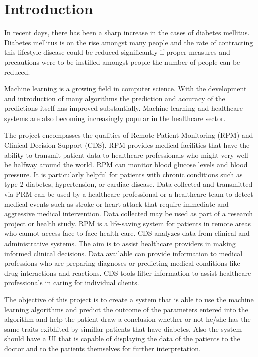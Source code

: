 \documentclass[12pt]{article}
\begin{document}
\section{Introduction}
In recent days, there has been a sharp increase in the cases of diabetes mellitus. Diabetes mellitus is on the rise amongst many people and the rate of contracting this lifestyle disease could be reduced significantly if proper measures and precautions were to be instilled amongst people the number of people can be reduced.

Machine learning is a growing field in computer science. With the development and introduction of many algorithms the prediction and accuracy of the predictions itself has improved substantially. Machine learning and healthcare systems are also becoming increasingly popular in the healthcare sector.

The project encompasses the qualities of Remote Patient Monitoring (RPM) and Clinical Decision Support (CDS). RPM provides medical facilities that have the ability to transmit patient data to healthcare professionals who might very well be halfway around the world. RPM can monitor blood glucose levels and blood pressure. It is particularly helpful for patients with chronic conditions such as type 2 diabetes, hypertension, or cardiac disease. Data collected and transmitted via PRM can be used by a healthcare professional or a healthcare team to detect medical events such as stroke or heart attack that require immediate and aggressive medical intervention. Data collected may be used as part of a research project or health study. RPM is a life-saving system for patients in remote areas who cannot access face-to-face health care. CDS analyzes data from clinical and administrative systems. The aim is to assist healthcare providers in making informed clinical decisions. Data available can provide information to medical professions who are preparing diagnoses or predicting medical conditions like drug interactions and reactions. CDS tools filter information to assist healthcare professionals in caring for individual clients. 

The objective of this project is to create a  system that is able to use the machine learning algorithms and predict the outcome of the parameters entered into the algorithm and help the patient draw a conclusion whether or not he/she has the same traits exibhited by simillar patients that have diabetes. Also the system should have a UI that is capable of displaying the data of the patients to the doctor and to the patients themselves for further interpretation.
\end{document}
